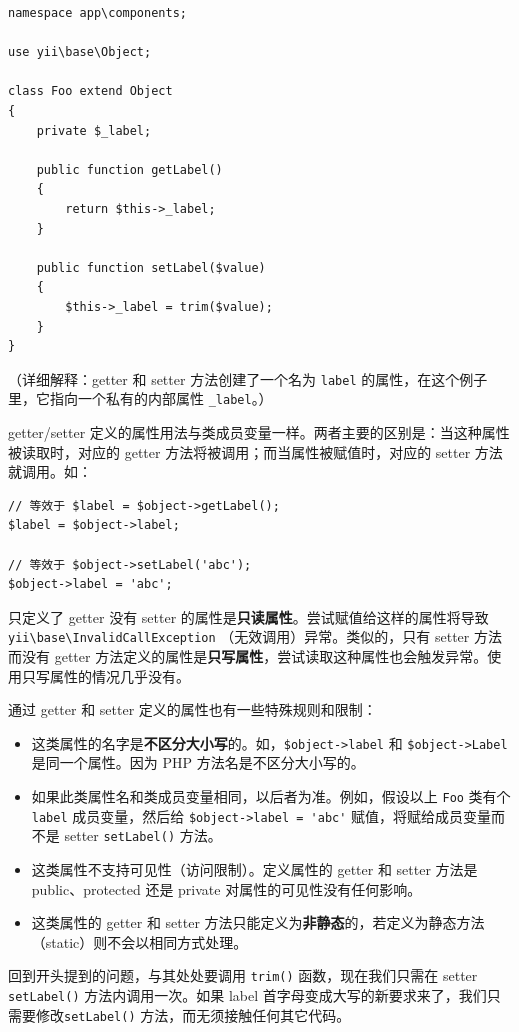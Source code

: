 \lstset{language=php}\begin{lstlisting}
namespace app\components;

use yii\base\Object;

class Foo extend Object
{
    private $_label;

    public function getLabel()
    {
        return $this->_label;
    }

    public function setLabel($value)
    {
        $this->_label = trim($value);
    }
}
\end{lstlisting}
（详细解释：getter 和 setter 方法创建了一个名为 \lstinline|label| 的属性，在这个例子里，它指向一个私有的内部属性 \lstinline|_label|。）

getter/setter 定义的属性用法与类成员变量一样。两者主要的区别是：当这种属性被读取时，对应的 getter 方法将被调用；而当属性被赋值时，对应的 setter 方法就调用。如：

\lstset{language=php}\begin{lstlisting}
// 等效于 $label = $object->getLabel();
$label = $object->label;

// 等效于 $object->setLabel('abc');
$object->label = 'abc';
\end{lstlisting}
只定义了 getter 没有 setter 的属性是\textbf{只读属性}。尝试赋值给这样的属性将导致 \texttt{yii{\allowbreak{}\textbackslash}base{\allowbreak{}\textbackslash}InvalidCallException} （无效调用）异常。类似的，只有 setter 方法而没有 getter 方法定义的属性是\textbf{只写属性}，尝试读取这种属性也会触发异常。使用只写属性的情况几乎没有。

通过 getter 和 setter 定义的属性也有一些特殊规则和限制：

\begin{itemize}
\item 这类属性的名字是\textbf{不区分大小写}的。如，\lstinline|$object->label| 和 \lstinline|$object->Label| 是同一个属性。因为 PHP 方法名是不区分大小写的。
\item 如果此类属性名和类成员变量相同，以后者为准。例如，假设以上 \lstinline|Foo| 类有个 \lstinline|label| 成员变量，然后给 \lstinline|$object->label = 'abc'| 赋值，将赋给成员变量而不是 setter \lstinline|setLabel()| 方法。
\item 这类属性不支持可见性（访问限制）。定义属性的 getter 和 setter 方法是 public、protected 还是 private 对属性的可见性没有任何影响。
\item 这类属性的 getter 和 setter 方法只能定义为\textbf{非静态}的，若定义为静态方法（static）则不会以相同方式处理。
\end{itemize}
回到开头提到的问题，与其处处要调用 \lstinline|trim()| 函数，现在我们只需在 setter \lstinline|setLabel()| 方法内调用一次。如果 label 首字母变成大写的新要求来了，我们只需要修改\lstinline|setLabel()| 方法，而无须接触任何其它代码。



